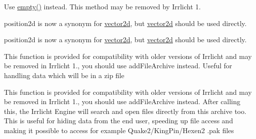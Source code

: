 
\begin{DoxyRefList}
\item[\label{deprecated__deprecated000005}%
\hypertarget{deprecated__deprecated000005}{}%
Member \hyperlink{classirr_1_1core_1_1map_abe50aefff40a6d71aa9f8b616acaa464}{irr\+:\+:core\+:\+:map$<$ Key\+Type, Value\+Type $>$\+:\+:is\+Empty} () const ]Use \hyperlink{classirr_1_1core_1_1map_a910309524c697daa29877863b49ed3b9}{empty()} instead. This method may be removed by Irrlicht 1.  
\item[\label{deprecated__deprecated000008}%
\hypertarget{deprecated__deprecated000008}{}%
Member \hyperlink{namespaceirr_1_1core_ad9a4cf4ed6b9e8763ffd6656121fd32e}{irr\+:\+:core\+:\+:position2df} ]position2d is now a synonym for \hyperlink{classirr_1_1core_1_1vector2d}{vector2d}, but \hyperlink{classirr_1_1core_1_1vector2d}{vector2d} should be used directly.  
\item[\label{deprecated__deprecated000009}%
\hypertarget{deprecated__deprecated000009}{}%
Member \hyperlink{namespaceirr_1_1core_a3643c2cc7820dd78cd87e73a46b92145}{irr\+:\+:core\+:\+:position2di} ]position2d is now a synonym for \hyperlink{classirr_1_1core_1_1vector2d}{vector2d}, but \hyperlink{classirr_1_1core_1_1vector2d}{vector2d} should be used directly.  
\item[\label{deprecated__deprecated000002}%
\hypertarget{deprecated__deprecated000002}{}%
Member \hyperlink{classirr_1_1io_1_1IFileSystem_a7b5235a1473ff67d97f1487211762723}{irr\+:\+:io\+:\+:I\+File\+System\+:\+:add\+Folder\+File\+Archive} (const c8 $\ast$filename, bool ignore\+Case=true, bool ignore\+Paths=true)]This function is provided for compatibility with older versions of Irrlicht and may be removed in Irrlicht 1., you should use add\+File\+Archive instead. Useful for handling data which will be in a zip file  
\item[\label{deprecated__deprecated000003}%
\hypertarget{deprecated__deprecated000003}{}%
Member \hyperlink{classirr_1_1io_1_1IFileSystem_a5ade21d59a80b16965d57d1977ad6cc4}{irr\+:\+:io\+:\+:I\+File\+System\+:\+:add\+Pak\+File\+Archive} (const c8 $\ast$filename, bool ignore\+Case=true, bool ignore\+Paths=true)]This function is provided for compatibility with older versions of Irrlicht and may be removed in Irrlicht 1., you should use add\+File\+Archive instead. After calling this, the Irrlicht Engine will search and open files directly from this archive too. This is useful for hiding data from the end user, speeding up file access and making it possible to access for example Quake2/\+King\+Pin/\+Hexen2 .pak files  

\end{DoxyRefList}
